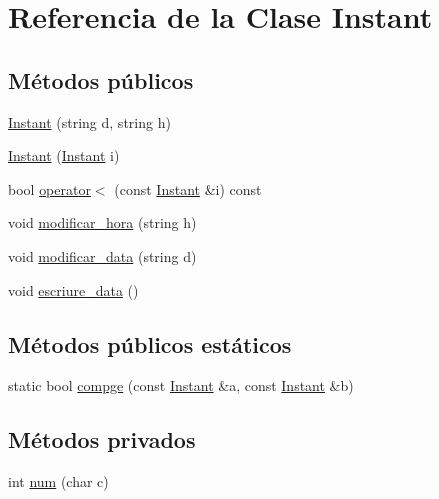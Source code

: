\hypertarget{class_instant}{\section{Referencia de la Clase Instant}
\label{class_instant}
}
\subsection*{Métodos públicos}
\begin{DoxyCompactItemize}
\item 
\hyperlink{class_instant_ad49e0d8095a5f9be466421641ca71a8b}{Instant} (string d, string h)
\item 
\hyperlink{class_instant_aa5f0f24904311730ad9a61c3f3c76604}{Instant} (\hyperlink{class_instant}{Instant} i)
\item 
bool \hyperlink{class_instant_ad3dbbdcb8f7cce6bf28bd109a4b6cbc2}{operator$<$} (const \hyperlink{class_instant}{Instant} \&i) const 
\item 
void \hyperlink{class_instant_a9f5b85dfca181715c6814b492b357c70}{modificar\-\_\-hora} (string h)
\item 
void \hyperlink{class_instant_a7db61132a491c96b02c60f6b68ead889}{modificar\-\_\-data} (string d)
\item 
void \hyperlink{class_instant_a5dc8fbbbaeb033472b6f17262b60f4a7}{escriure\-\_\-data} ()
\end{DoxyCompactItemize}
\subsection*{Métodos públicos estáticos}
\begin{DoxyCompactItemize}
\item 
static bool \hyperlink{class_instant_a83ad75456b21fd0121910d766b86ffec}{compge} (const \hyperlink{class_instant}{Instant} \&a, const \hyperlink{class_instant}{Instant} \&b)
\end{DoxyCompactItemize}
\subsection*{Métodos privados}
\begin{DoxyCompactItemize}
\item 
int \hyperlink{class_instant_a746f521daeb12b3b1d67d1c4ac19a4bc}{num} (char c)
\end{DoxyCompactItemize}
